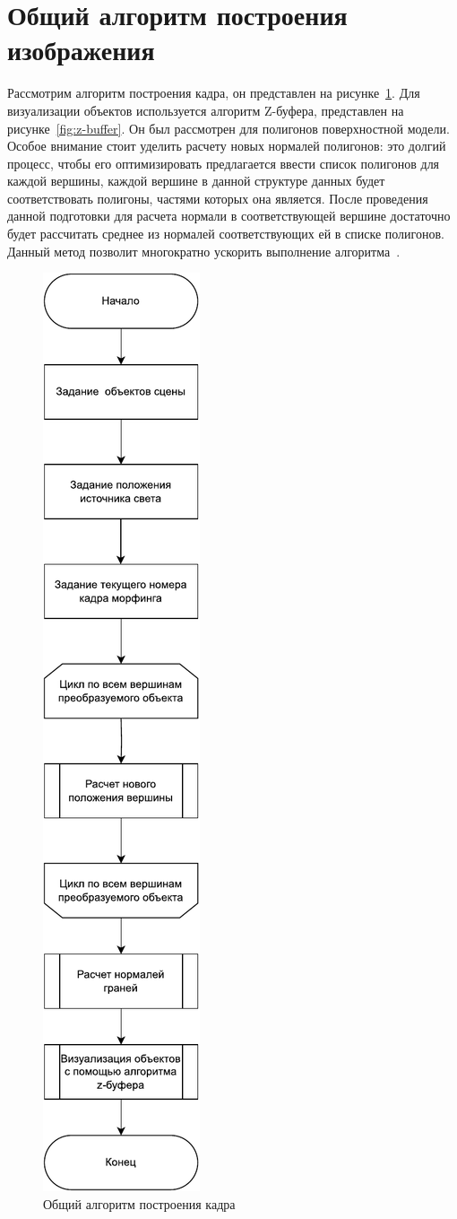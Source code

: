 \section{Общий алгоритм построения изображения}
Рассмотрим алгоритм построения кадра, он представлен на рисунке~\ref{fig:frame_algo}. 
Для визуализации объектов используется алгоритм Z-буфера, представлен на рисунке~\ref{fig:z-buffer}.
Он был рассмотрен для полигонов поверхностной модели.
Особое внимание стоит уделить расчету новых нормалей полигонов: это долгий процесс, чтобы его оптимизировать предлагается ввести список полигонов для каждой вершины, каждой вершине в данной структуре данных будет соответствовать полигоны, частями которых она является. 
После проведения данной подготовки для расчета нормали в соответствующей вершине достаточно будет рассчитать среднее из нормалей соответствующих ей в списке полигонов. 
Данный метод позволит многократно ускорить выполнение алгоритма~\cite{morphing_algo}.


\begin{figure}[H]
	\centering
	\includegraphics[height=1.5\textwidth]{images/frameAlgoMorph.pdf}
	\caption{Общий алгоритм построения кадра}
	\label{fig:frame_algo}
\end{figure}

